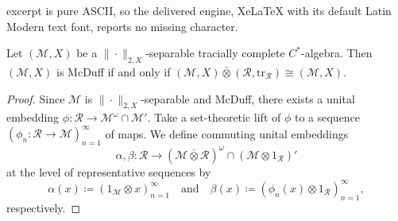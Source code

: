 \documentclass[10pt,a4paper]{amsart}
\newcommand{\M}{\mathcal{M}}
\newcommand{\R}{\mathcal R}
\newcommand{\barotimes}{\bar\otimes}
\newcommand{\tr}{\mathrm{tr}}
\begin{document}
excerpt is pure ASCII, so the delivered engine, XeLaTeX with its default Latin Modern text font, reports no missing character.
\begin{theorem}\label{thm:McDuff-tensor}
Let $(\M, X)$ be a $\|\cdot\|_{2,X}$-separable tracially complete $C^*$-algebra.  Then $(\M, X)$ is McDuff if and only if $(\M,X) \barotimes (\R,\tr_\R) \cong (\M,X)$.
\end{theorem}

\begin{proof}
Since  $\M$ is $\|\cdot\|_{2, X}$-separable and McDuff, there exists a unital embedding $\phi\colon \R \rightarrow \M^\omega \cap \M'$.
Take a set-theoretic lift of $\phi$ to a sequence $(\phi_{n}\colon \R \to \M)_{n=1}^\infty$  of maps.
We define commuting unital embeddings 
\begin{equation}
    \alpha,\beta\colon \R \rightarrow (\M \barotimes \R)^\omega \cap (\M \otimes 1_{\R})'
\end{equation}
at the level of representative sequences by 
\begin{equation}
    \alpha(x)\coloneqq (1_{\M} \otimes x)_{n=1}^\infty \quad \text{and} \quad \beta(x) \coloneqq (\phi_n(x) \otimes 1_{\R} )_{n=1}^\infty,
\end{equation} respectively. 


\end{proof}
\end{document}
